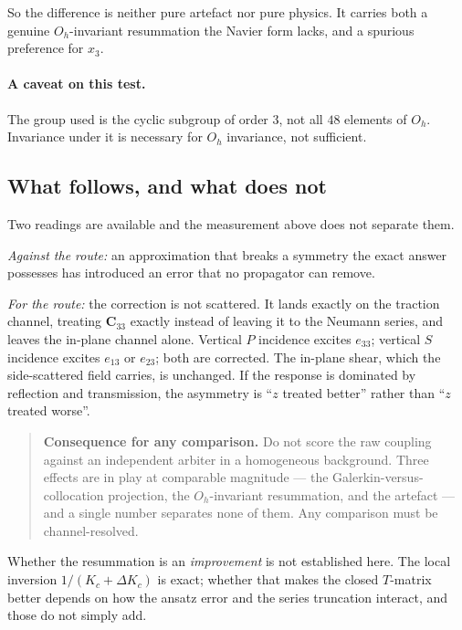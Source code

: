 \documentclass[11pt,a4paper]{article}
\newcommand{\bC}{\mathbf{C}}
\newcommand{\Oh}{O_{h}}
\begin{document}
So the difference is neither pure artefact nor pure physics.  It carries both a
genuine $\Oh$-invariant resummation the Navier form lacks, and a spurious
preference for $x_3$.

\paragraph{A caveat on this test.}  The group used is the cyclic subgroup of
order $3$, not all $48$ elements of $\Oh$.  Invariance under it is necessary for
$\Oh$ invariance, not sufficient.

\subsection{What follows, and what does not}

Two readings are available and the measurement above does not separate them.

\emph{Against the route:} an approximation that breaks a symmetry the exact
answer possesses has introduced an error that no propagator can remove.

\emph{For the route:} the correction is not scattered.  It lands exactly on the
traction channel, treating $\bC_{33}$ exactly instead of leaving it to the
Neumann series, and leaves the in-plane channel alone.  Vertical $P$ incidence
excites $e_{33}$; vertical $S$ incidence excites $e_{13}$ or $e_{23}$; both are
corrected.  The in-plane shear, which the side-scattered field carries, is
unchanged.  If the response is dominated by reflection and transmission, the
asymmetry is ``$z$ treated better'' rather than ``$z$ treated worse''.

\begin{quote}
\textbf{Consequence for any comparison.}  Do not score the raw coupling against
an independent arbiter in a homogeneous background.  Three effects are in play
at comparable magnitude --- the Galerkin-versus-collocation projection, the
$\Oh$-invariant resummation, and the artefact --- and a single number separates
none of them.  Any comparison must be channel-resolved.
\end{quote}

Whether the resummation is an \emph{improvement} is not established here.  The
local inversion $1/(K_c+\Delta K_c)$ is exact; whether that makes the closed
$T$-matrix better depends on how the ansatz error and the series truncation
interact, and those do not simply add.

\end{document}
